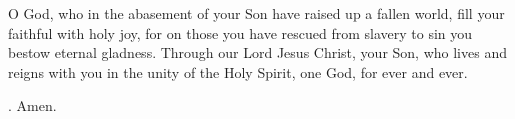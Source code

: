 \lettrine[lines=3]{O}{} God, who in the abasement of your Son
have raised up a fallen world,
fill your faithful with holy joy,
for on those you have rescued from slavery to sin
you bestow eternal gladness.
Through our Lord Jesus Christ, your Son,
who lives and reigns with you in the unity of the Holy Spirit,
one God, for ever and ever. \par \Rbar. Amen.
